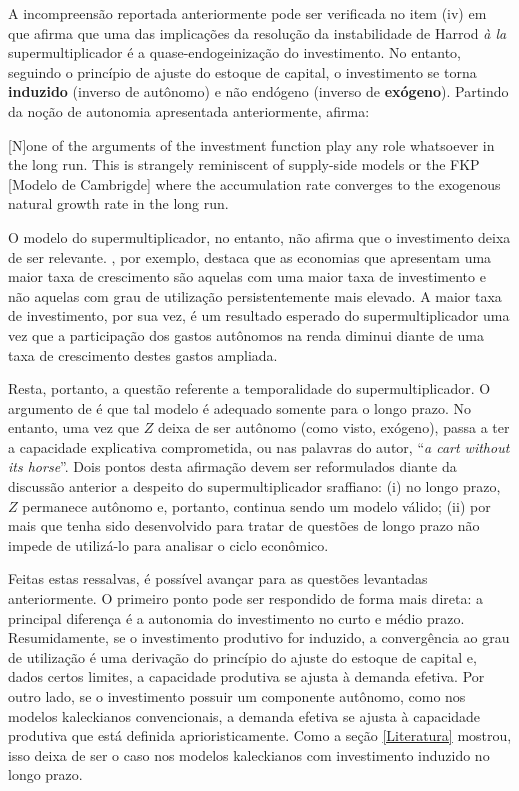 A incompreensão reportada anteriormente pode ser verificada no item (iv) em que afirma que uma das implicações da resolução da instabilidade de Harrod \textit{à la} supermultiplicador é a quase-endogeinização do investimento. No entanto, seguindo o princípio de ajuste do estoque de capital, o investimento se torna \textbf{induzido} (inverso de autônomo) e não endógeno (inverso de \textbf{exógeno}). Partindo da noção de autonomia apresentada anteriormente, \citeauthor*{nikiforos_comments_2018} afirma:
\begin{citacao}

[N]one of the arguments of the investment function play any role whatsoever in the long run. This is strangely
reminiscent of supply-side models or the FKP [Modelo de Cambrigde] where the accumulation rate converges to the
exogenous natural growth rate in the long run. \cite[p.~11--12, comentario adicionado]{nikiforos_comments_2018}
\end{citacao}
O modelo do supermultiplicador, no entanto, não afirma que o investimento deixa de ser relevante. \textcite{dejuan_hidden_2017}, por exemplo, destaca que as economias que apresentam uma maior taxa de crescimento são aquelas com uma maior taxa de investimento e não aquelas com grau de utilização persistentemente mais elevado. A maior taxa de investimento, por sua vez, é um resultado esperado do supermultiplicador uma vez que a participação dos gastos autônomos na renda diminui diante de uma taxa de crescimento destes gastos ampliada.

Resta, portanto, a questão referente a temporalidade do supermultiplicador. O argumento de \citeauthor*{nikiforos_comments_2018} é que tal modelo é adequado somente para o longo prazo. No entanto, uma vez que $Z$ deixa de ser autônomo (como visto, exógeno), passa a ter a capacidade explicativa comprometida, ou nas palavras do autor, ``\textit{a cart without its horse}''. Dois pontos desta afirmação devem ser reformulados diante da discussão anterior a despeito do supermultiplicador sraffiano: (i) no longo prazo, $Z$ permanece autônomo e, portanto, continua sendo um modelo válido; (ii) por mais que tenha sido desenvolvido para tratar de questões de longo prazo não impede de utilizá-lo para analisar o ciclo econômico. 

Feitas estas ressalvas, é possível avançar para as questões levantadas anteriormente.  O primeiro ponto pode ser respondido de forma mais direta: a principal diferença é a autonomia do investimento no curto e médio prazo.  Resumidamente, se o investimento produtivo for induzido, a convergência ao grau de utilização é uma derivação do princípio do ajuste do estoque de capital e, dados certos limites, a capacidade produtiva se ajusta à demanda efetiva. Por outro lado, se o investimento possuir um componente autônomo, como nos modelos kaleckianos convencionais, a demanda efetiva se ajusta à capacidade produtiva que está definida aprioristicamente. Como a seção \ref{Literatura} mostrou, isso deixa de ser o caso nos modelos kaleckianos com investimento induzido no longo prazo.

